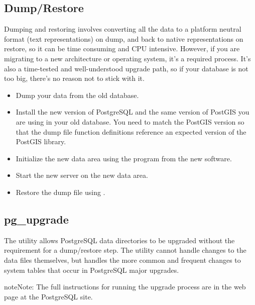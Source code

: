 \documentclass[a4paper,11pt,english]{sphinxmanual}
\begin{document}
\subsection{Dump/Restore}
\label{\detokenize{maintenance:dump-restore}}
Dumping and restoring involves converting all the data to a platform neutral format (text representations) on dump, and back to native representations on restore, so it can be time consuming and CPU intensive. However, if you are migrating to a new architecture or operating system, it’s a required process. It’s also a time-tested and well-understood upgrade path, so if your database is not too big, there’s no reason not to stick with it.
\begin{itemize}
\item {} 
Dump your data  from the old database.

\item {} 
Install the new version of PostgreSQL and the same version of PostGIS you are using in your old database. You need to match the PostGIS version so that the dump file function definitions reference an expected version of the PostGIS library.

\item {} 
Initialize the new data area using the  program from the new software.

\item {} 
Start the new server on the new data area.

\item {} 
Restore the dump file using .

\end{itemize}


\subsection{pg\_upgrade}
\label{\detokenize{maintenance:pg-upgrade}}
The  utility allows PostgreSQL data directories to be upgraded without the requirement for a dump/restore step. The utility cannot handle changes to the data files themselves, but handles the more common and frequent changes to system tables that occur in PostgreSQL major upgrades.

\begin{sphinxadmonition}{note}{Note:}
The full instructions for running the upgrade process are in the  web page at the PostgreSQL site.
\end{sphinxadmonition}
\end{document}
